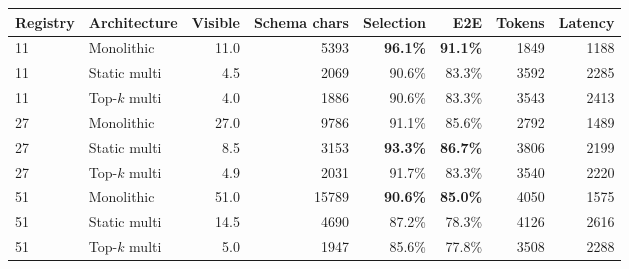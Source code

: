 \begin{tabular}{llrrrrrr}
\toprule
Registry & Architecture & Visible & Schema chars & Selection & E2E & Tokens & Latency \\
\midrule
11 & Monolithic & 11.0 & 5393 & \textbf{96.1\%} & \textbf{91.1\%} & 1849 & 1188 \\
11 & Static multi & 4.5 & 2069 & 90.6\% & 83.3\% & 3592 & 2285 \\
11 & Top-$k$ multi & 4.0 & 1886 & 90.6\% & 83.3\% & 3543 & 2413 \\
\midrule
27 & Monolithic & 27.0 & 9786 & 91.1\% & 85.6\% & 2792 & 1489 \\
27 & Static multi & 8.5 & 3153 & \textbf{93.3\%} & \textbf{86.7\%} & 3806 & 2199 \\
27 & Top-$k$ multi & 4.9 & 2031 & 91.7\% & 83.3\% & 3540 & 2220 \\
\midrule
51 & Monolithic & 51.0 & 15789 & \textbf{90.6\%} & \textbf{85.0\%} & 4050 & 1575 \\
51 & Static multi & 14.5 & 4690 & 87.2\% & 78.3\% & 4126 & 2616 \\
51 & Top-$k$ multi & 5.0 & 1947 & 85.6\% & 77.8\% & 3508 & 2288 \\
\bottomrule
\end{tabular}
